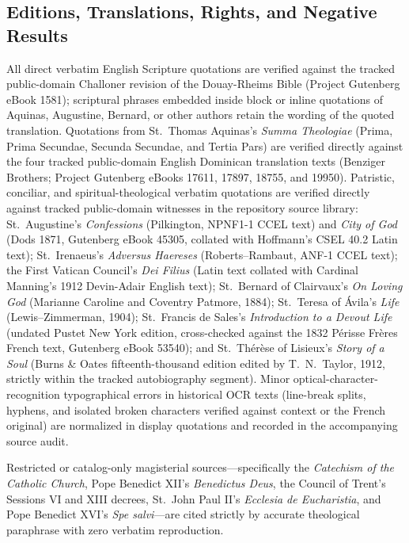 \subsection*{Editions, Translations, Rights, and Negative Results}

All direct verbatim English Scripture quotations are verified against the tracked public-domain Challoner revision of the Douay-Rheims Bible (Project Gutenberg eBook 1581); scriptural phrases embedded inside block or inline quotations of Aquinas, Augustine, Bernard, or other authors retain the wording of the quoted translation. Quotations from St.\ Thomas Aquinas's \emph{Summa Theologiae} (Prima, Prima Secundae, Secunda Secundae, and Tertia Pars) are verified directly against the four tracked public-domain English Dominican translation texts (Benziger Brothers; Project Gutenberg eBooks 17611, 17897, 18755, and 19950). Patristic, conciliar, and spiritual-theological verbatim quotations are verified directly against tracked public-domain witnesses in the repository source library: St.\ Augustine's \emph{Confessions} (Pilkington, NPNF1-1 CCEL text) and \emph{City of God} (Dods 1871, Gutenberg eBook 45305, collated with Hoffmann's CSEL 40.2 Latin text); St.\ Irenaeus's \emph{Adversus Haereses} (Roberts--Rambaut, ANF-1 CCEL text); the First Vatican Council's \emph{Dei Filius} (Latin text collated with Cardinal Manning's 1912 Devin-Adair English text); St.\ Bernard of Clairvaux's \emph{On Loving God} (Marianne Caroline and Coventry Patmore, 1884); St.\ Teresa of Ávila's \emph{Life} (Lewis--Zimmerman, 1904); St.\ Francis de Sales's \emph{Introduction to a Devout Life} (undated Pustet New York edition, cross-checked against the 1832 P\'erisse Fr\`eres French text, Gutenberg eBook 53540); and St.\ Th\'er\`ese of Lisieux's \emph{Story of a Soul} (Burns \& Oates fifteenth-thousand edition edited by T.\ N.\ Taylor, 1912, strictly within the tracked autobiography segment). Minor optical-character-recognition typographical errors in historical OCR texts (line-break splits, hyphens, and isolated broken characters verified against context or the French original) are normalized in display quotations and recorded in the accompanying source audit.

Restricted or catalog-only magisterial sources---specifically the \emph{Catechism of the Catholic Church}, Pope Benedict XII's \emph{Benedictus Deus}, the Council of Trent's Sessions VI and XIII decrees, St.\ John Paul II's \emph{Ecclesia de Eucharistia}, and Pope Benedict XVI's \emph{Spe salvi}---are cited strictly by accurate theological paraphrase with zero verbatim reproduction.

